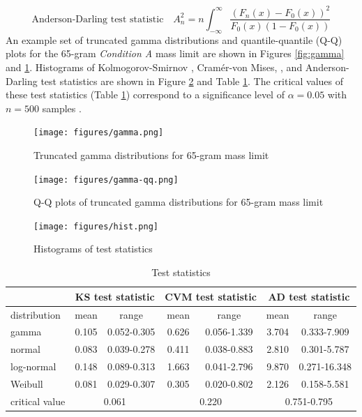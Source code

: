 \begin{equation}
  \label{eq:ad}
  \mbox{Anderson-Darling test statistic} \quad A_{n}^{2} = n \int_{-\infty}^{\infty} \frac{(F_{n}(x) - F_{0}(x))^2}{F_{0}(x)(1 - F_{0}(x))}
\end{equation}
\vspace{+0.4cm}
An example set of truncated gamma distributions and quantile-quantile (Q-Q) plots for the 65-gram \textit{Condition A} mass limit are shown in Figures \ref{fig:gamma} and \ref{fig:qq}.
Histograms of Kolmogorov-Smirnov \cite{massey}, Cram\'{e}r-von Mises, \cite{cramer}, and Anderson-Darling \cite{anderson} test statistics are shown in Figure \ref{fig:hist} and Table \ref{table:test}.
The critical values of these test statistics (Table \ref{table:test}) correspond to a significance level of $\alpha = 0.05$ with $n = 500$ samples \cite{d'agostino}.
%
\begin{figure}
  \centering
  \texttt{[image: figures/gamma.png]}
  \caption{Truncated gamma distributions for 65-gram mass limit}
  \label{fig:gamma}
  \vspace{+1.1cm}
  \texttt{[image: figures/gamma-qq.png]}
  \caption{Q-Q plots of truncated gamma distributions for 65-gram mass limit}
  \label{fig:qq}
\end{figure}

\begin{figure}[H]
  \centering
  \texttt{[image: figures/hist.png]}
  \caption{Histograms of test statistics}
  \label{fig:hist}
\end{figure}

\begin{table}
  \caption{Test statistics}
  \label{table:test}
  \renewcommand\arraystretch{1.5}
  \begin{center}
    \begin{tabular}{|l|c c|c c|c c|}
      \multicolumn{1}{c}{} & \multicolumn{2}{c}{KS test statistic} & \multicolumn{2}{c}{CVM test statistic} & \multicolumn{2}{c}{AD test statistic} \\
      \hline
      distribution         & mean  & range                      & mean  & range                       & mean  & range \\
      \hline
      gamma                & 0.105 & 0.052-0.305                & 0.626 & 0.056-1.339                 & 3.704 & 0.333-7.909 \\
      normal               & 0.083 & 0.039-0.278                & 0.411 & 0.038-0.883                 & 2.810 & 0.301-5.787 \\
      log-normal           & 0.148 & 0.089-0.313                & 1.663 & 0.041-2.796                 & 9.870 & 0.271-16.348 \\
      Weibull              & 0.081 & 0.029-0.307                & 0.305 & 0.020-0.802                 & 2.126 & 0.158-5.581 \\
      \hline
      critical value       & \multicolumn{2}{c|}{0.061}         & \multicolumn{2}{c|}{0.220}          & \multicolumn{2}{c|}{0.751-0.795} \\
      \hline
    \end{tabular}
  \end{center}
\end{table}

